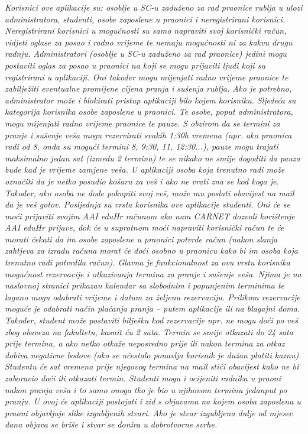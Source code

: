 			\textit{Korisnici ove aplikacije su: osoblje u SC-u zaduženo za rad praonice rublja u ulozi administratora,
			studenti, osobe zaposlene u praonici i neregistrirani korisnici.
			Neregistrirani korisnici u mogućnosti su samo napraviti svoj korisnički račun, vidjeti oglase za posao i
			radno vrijeme te nemaju mogućnosti ni za kakvu drugu radnju.
			Administratori (osoblje u SC-u zaduženo za rad praonice) jedini mogu postaviti oglas za posao u praonici
			na koji se mogu prijaviti ljudi koji su registrirani u aplikaciji. Oni također mogu mijenjati radno vrijeme
			praonice te zabilježiti eventualne promijene cijena pranja i sušenja rublja. Ako je potrebno,
			administrator može i blokirati pristup aplikaciji bilo kojem korisniku.
			Sljedeća su kategorija korisnika osobe zaposlene u praonici. Te osobe, poput administratora, mogu
			mijenjati radno vrijeme praonice te pauze. S obzirom da se termini za pranje i sušenje veša mogu
			rezervirati svakih 1:30h vremena (npr. ako praonica radi od 8, onda su mogući termini 8, 9:30, 11,
			12:30...), pauze mogu trajati maksimalno jedan sat (između 2 termina) te se nikako ne smije dogoditi da
			pauza bude kad je vrijeme zamjene veša. U aplikaciji osoba koja trenutno radi može označiti da je netko
			posudio košaru za veš i ako ne vrati zna se kod koga je. Također, ako osoba ne dođe pokupiti svoj veš,
			može mu poslati obavijest na mail da je veš gotov.
			Posljednja su vrsta korisnika ove aplikacije studenti. Oni će se moći prijaviti svojim AAI eduHr računom
			ako nam CARNET dozvoli korištenje AAI eduHr prijave, dok će u suprotnom moći napraviti korisnički
			račun te će morati čekati da im osobe zaposlene u praonici potvrde račun (nakon slanja zahtjeva za
			izradu računa morat će doći osobno u praonicu kako bi im osoba koja trenutno radi potvrdila račun).
			Glavna je funkcionalnost za ovu vrstu korisnika mogućnost rezervacije i otkazivanja termina za pranje i
			sušenje veša. Njima je na naslovnoj stranici prikazan kalendar sa slobodnim i popunjenim terminima te
			lagano mogu odabrati vrijeme i datum za željenu rezervaciju. Prilikom rezervacije moguće je odabrati
			način plaćanja pranja – putem aplikacije ili na blagajni doma. Također, student može postaviti bilješku
			kod rezervacije npr. ne mogu doći po veš zbog obaveza na fakultetu, kasnit ću 2 sata. Termin se smije
			otkazati do 24 sata prije termina, a ako netko otkaže neposredno prije ili nakon termina za otkaz dobiva
			negativne bodove (ako se učestalo ponavlja korisnik je dužan platiti kaznu). Studentu će sat vremena
			prije njegovog termina na mail stići obavijest kako ne bi zaboravio doći ili otkazati termin.
			Studenti mogu i ocijeniti radnika u praoni nakon pranja veša i to samo onoga tko je bio u njihovom
			terminu jedanput po pranju.
			U ovoj će aplikaciji postojati i zid s objavama na kojem osoba zaposlena u praoni objavljuje slike
			izgubljenih stvari. Ako je stvar izgubljena dulje od mjesec dana objava se briše i stvar se donira u
			dobrotvorne svrhe. }
		
